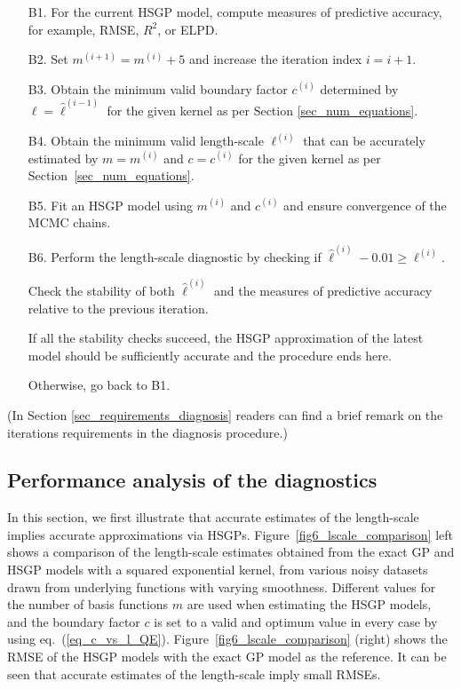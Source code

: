 \begin{enumerate}

\item[B1.] For the current HSGP model, compute measures of predictive accuracy, for example, RMSE, $R^2$, or ELPD.

\item[B2.] Set $m^{(i+1)} = m^{(i)} + 5$ and increase the iteration index $i = i + 1$.

\item[B3.] Obtain the minimum valid boundary factor $c^{(i)}$ determined by $\ell = \hat{\ell}^{(i-1)}$ for the given kernel as per Section \ref{sec_num_equations}.

\item[B4.] Obtain the minimum valid length-scale $\ell^{(i)}$ that can be accurately estimated by $m = m^{(i)}$ and $c = c^{(i)}$ for the given kernel as per Section~\ref{sec_num_equations}.

\item[B5.] Fit an HSGP model using $m^{(i)}$ and $c^{(i)}$ and ensure convergence of the MCMC chains.

\item[B6.] Perform the length-scale diagnostic by checking if $\hat{\ell}^{(i)} - 0.01 \geq \ell^{(i)}$. 

Check the stability of both $\hat{\ell}^{(i)}$ and the measures of predictive accuracy relative to the previous iteration.

If all the stability checks succeed, the HSGP approximation of the latest model should be sufficiently accurate and the procedure ends here.

Otherwise, go back to B1.
\end{enumerate}

({\color{blue}In Section \ref{sec_requirements_diagnosis} readers can find a brief remark on the iterations requirements in the diagnosis procedure.})

\subsection{Performance analysis of the diagnostics}

In this section, we first illustrate that accurate estimates of the length-scale implies accurate approximations via HSGPs. Figure~\ref{fig6_lscale_comparison} left shows a comparison of the length-scale estimates
obtained from the exact GP and HSGP models with a squared exponential kernel, from various noisy datasets drawn from underlying functions with varying smoothness. Different values for the number of basis functions $m$ are used when estimating the HSGP models, and the boundary factor $c$ is set to a valid and optimum value in every case by using eq.~(\ref{eq_c_vs_l_QE}). Figure~\ref{fig6_lscale_comparison} (right) shows the RMSE of the HSGP models with the exact GP model as the reference. It can be seen that accurate estimates of the length-scale imply small RMSEs.

